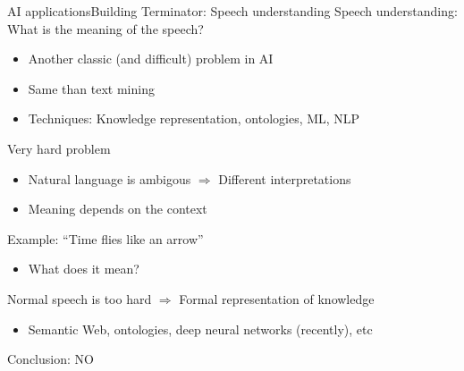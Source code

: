 \documentclass[10pt,compress]{beamer} %
\begin{document}
\begin{frame}{AI applications}{Building Terminator: Speech understanding}
	Speech understanding: What is the meaning of the speech?
	\begin{itemize}
		\item Another classic (and difficult) problem in AI
		\item Same than text mining
		\item Techniques: Knowledge representation, ontologies, ML, NLP
	\end{itemize}
	Very hard problem
	\begin{itemize}
		\item Natural language is ambigous $\Rightarrow$ Different interpretations 
		\item Meaning depends on the context
	\end{itemize}
	Example: ``Time flies like an arrow''
	\begin{itemize}
		\item What does it mean?
	\end{itemize}
	Normal speech is too hard $\Rightarrow$ Formal representation of knowledge
	\begin{itemize}
		\item Semantic Web, ontologies, deep neural networks (recently), etc
	\end{itemize}
	Conclusion: NO
\end{frame}
\end{document}
